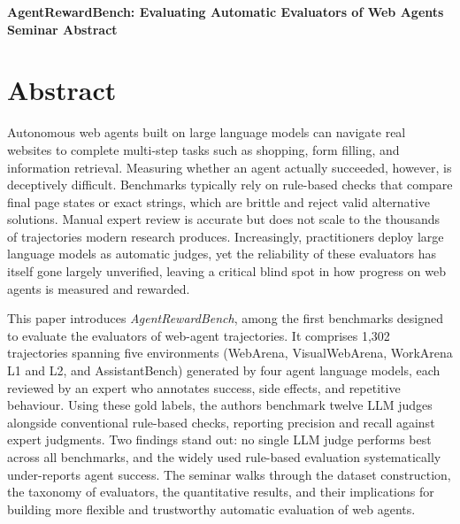 \documentclass[11pt]{article}
\begin{document}
\begin{center}
{\LARGE\bfseries AgentRewardBench: Evaluating Automatic Evaluators of Web Agents}\\[1.1em]
{\large\bfseries Seminar Abstract}\\[0.6em]
{\normalsize \seminarDate}
\end{center}
\vspace{0.6em}
\section*{Abstract}
Autonomous web agents built on large language models can navigate real websites to complete multi-step tasks such as shopping, form filling, and information retrieval. Measuring whether an agent actually succeeded, however, is deceptively difficult. Benchmarks typically rely on rule-based checks that compare final page states or exact strings, which are brittle and reject valid alternative solutions. Manual expert review is accurate but does not scale to the thousands of trajectories modern research produces. Increasingly, practitioners deploy large language models as automatic judges, yet the reliability of these evaluators has itself gone largely unverified, leaving a critical blind spot in how progress on web agents is measured and rewarded.

This paper introduces \emph{AgentRewardBench}, among the first benchmarks designed to evaluate the evaluators of web-agent trajectories. It comprises 1,302 trajectories spanning five environments (WebArena, VisualWebArena, WorkArena L1 and L2, and AssistantBench) generated by four agent language models, each reviewed by an expert who annotates success, side effects, and repetitive behaviour. Using these gold labels, the authors benchmark twelve LLM judges alongside conventional rule-based checks, reporting precision and recall against expert judgments. Two findings stand out: no single LLM judge performs best across all benchmarks, and the widely used rule-based evaluation systematically under-reports agent success. The seminar walks through the dataset construction, the taxonomy of evaluators, the quantitative results, and their implications for building more flexible and trustworthy automatic evaluation of web agents.
\end{document}
